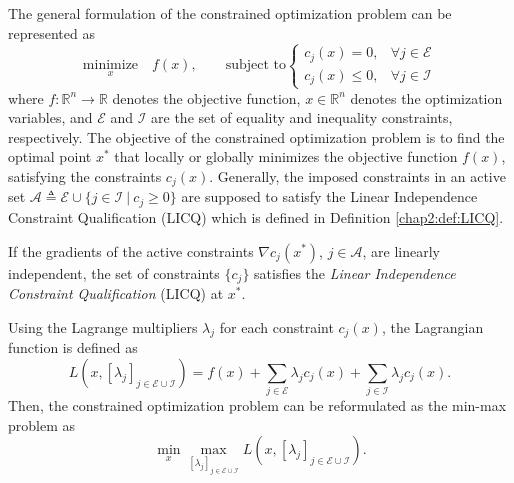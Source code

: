 The general formulation of the constrained optimization problem can be represented as 
\begin{equation}
    \underset{x}{\text{minimize}}\quad f(x),
    \quad\quad
    \text{subject to}
    \begin{cases}
      c_j(x)= 0,    & \forall j\in\mathcal E\\
      c_j(x)\leq 0, & \forall j\in\mathcal I 
    \end{cases}
\end{equation}
where $f:\mathbb R^n\to\mathbb R$ denotes the objective function, $x\in\mathbb R^n$ denotes the optimization variables, and $\mathcal E$ and $\mathcal I$ are the set of equality and inequality constraints, respectively.
The objective of the constrained optimization problem is to find the optimal point $x^*$ that locally or globally minimizes the objective function $f(x)$, satisfying the constraints $c_j(x)$.
Generally, the imposed constraints in an active set $\mathcal A\triangleq\mathcal E \cup \{j\in\mathcal I\ \vert \ c_j\ge0\}$ are supposed to satisfy the Linear Independence Constraint Qualification (LICQ) which is defined in Definition \ref{chap2:def:LICQ}.

\begin{definition}
  If the gradients of the active constraints $\nabla c_j(x^*)$, $j\in\mathcal A$, are linearly independent, the set of constraints $\{c_j\}$ satisfies the \textit{Linear Independence Constraint Qualification} (LICQ) at $x^*$.
  \label{chap2:def:LICQ}  
\end{definition}

Using the Lagrange multipliers $\lambda_j$ for each constraint $c_j(x)$, the Lagrangian function is defined as
\begin{equation}
    L(x,[\lambda_j]_{j\in\mathcal E\cup\mathcal I}) = f(x) + \sum_{j\in\mathcal E}\lambda_jc_j(x) + \sum_{j\in\mathcal I}\lambda_jc_j(x)
    .
\end{equation}
Then, the constrained optimization problem can be reformulated as the min-max problem as
\begin{equation}
  \min_x \max_{[\lambda_j]_{j\in\mathcal E\cup\mathcal I}} L(x, [\lambda_j]_{j\in\mathcal E\cup\mathcal I})
  .
\end{equation}

